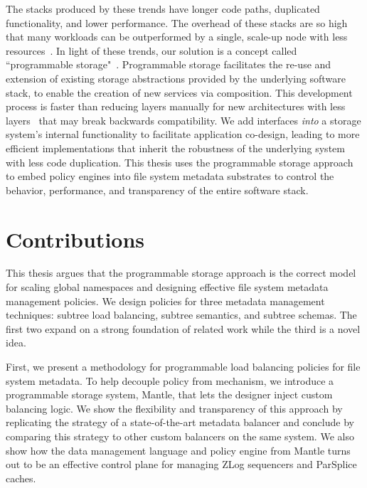 The stacks produced by these trends have longer code paths, duplicated
functionality, and lower performance.  The overhead of these stacks are so
high that many workloads can be outperformed by a single, scale-up node with
less resources~\cite{sevilla:discs2013-framework,
rowstron:hotcdp2012-hadoop-vs-single-node, schwarzkopf:hotcloud2012-7-sins,
gigaspaces:whitepaper2011-su-vs-so, michael:2007pdps-scale-up-x-scale-out}.  In
light of these trends, our solution is a concept called ``programmable
storage"~\cite{sevilla:eurosys17-malacology, watkins:hot17-declstor}.
Programmable storage facilitates the re-use and extension of existing storage
abstractions provided by the underlying software stack, to enable the creation
of new services via composition. This development process is faster than
reducing layers manually for new architectures with less
layers~\cite{bent:login16-hpc-trends} that may break backwards compatibility.
We add interfaces {\it into} a storage system's internal functionality to
facilitate application co-design, leading to more efficient implementations
that inherit the robustness of the underlying system with less code
duplication. This thesis uses the programmable storage approach to embed policy
engines into file system metadata substrates to control the behavior,
performance, and transparency of the entire software stack.

\section{Contributions}

This thesis argues that the programmable storage approach is the correct model
for scaling global namespaces and designing effective file system
metadata management policies. We design policies for three metadata management
techniques: subtree load balancing, subtree semantics, and subtree schemas.
The first two expand on a strong foundation of related work while the third is
a novel idea.

First, we present a methodology for programmable load balancing policies for
file system metadata.  To help decouple policy from mechanism, we introduce a
programmable storage system, Mantle, that lets the designer inject custom
balancing logic. We show the flexibility and transparency of this approach by
replicating the strategy of a state-of-the-art metadata balancer and conclude
by comparing this strategy to other custom balancers on the same system. We
also show how the data management language and policy engine from Mantle turns
out to be an effective control plane for managing ZLog sequencers and ParSplice
caches.

